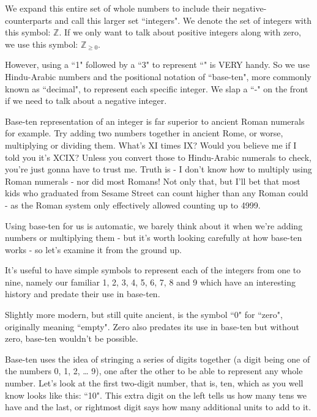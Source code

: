 \documentclass{article}
\begin{document}
We expand this entire set of whole numbers to include their
negative-counterparts and call this larger set ``integers".
We denote the set of integers with this symbol: $\mathbb{Z}$.
If we only want to talk about positive integers along with zero,
we use this symbol: $\mathbb{Z}_{\ge 0}$.

However, using a ``1" followed by a ``3" to represent
``\faApple{}\faApple{}\faApple{}\faApple{}\faApple{}\faApple{}\faApple{}\faApple{}\faApple{}\faApple{}\faApple{}\faApple{}\faApple{}"
is VERY handy.  So we use Hindu-Arabic numbers and the positional notation of ``base-ten",
more commonly known as ``decimal", to represent each specific integer.
We slap a ``-" on the front if we need to talk about a negative integer.

Base-ten representation of an integer is far superior to ancient Roman numerals for example.
Try adding two numbers together in ancient Rome, or worse,
multiplying or dividing them.
What's XI times IX? Would you believe me if I told
you it's XCIX? Unless you convert those to Hindu-Arabic numerals to check,
you're just gonna have to trust me.
Truth is - I don't know how to multiply using Roman
numerals - nor did most Romans! Not only that,
but I'll bet that most kids who graduated from Sesame Street
can count higher than any Roman could - as the
Roman system only effectively allowed counting up to 4999.

Using base-ten for us is automatic,
we barely think about it when we're adding numbers or multiplying
them - but it's worth looking carefully at how base-ten
works - so let's examine it from the ground up.

It's useful to have simple symbols to represent each of the integers from one to nine,
namely our familiar 1, 2, 3, 4, 5, 6, 7, 8 and 9
which have an interesting history and predate their use in base-ten.

Slightly more modern, but still quite ancient,
is the symbol ``0" for ``zero", originally meaning ``empty".
Zero also predates its use in base-ten but without zero,
base-ten wouldn't be possible.

Base-ten uses the idea of stringing a series of digits together
(a digit being one of the numbers 0, 1, 2, \dots{} 9),
one after the other to be able to represent any whole number.
Let's look at the first two-digit number, that is, ten,
which as you well know looks like this: ``10".
This extra digit on the left tells us how many tens we have and the last,
or rightmost digit says how many additional units to add to it.
\end{document}
